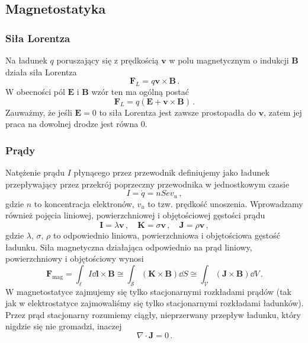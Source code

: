 \documentclass[../main.tex]{subfiles}
\begin{document}
\subsection{Magnetostatyka}
\subsubsection{Siła Lorentza}
Na ładunek \(q\) poruszający się z prędkością \(\mathbf{v}\) w polu magnetycznym o indukcji \(\mathbf{B}\) działa siła Lorentza
\begin{equation*}
    \mathbf{F}_L=q\mathbf{v}\times\mathbf{B}\,.
\end{equation*}
W obecności pól \(\mathbf{E}\) i \(\mathbf{B}\) wzór ten ma ogólną postać
\begin{equation*}
    \mathbf{F}_L=q(\mathbf{E}+\mathbf{v}\times\mathbf{B})\,.
\end{equation*}
Zauważmy, że jeśli \(\mathbf{E}=0\) to siła Lorentza jest zawsze prostopadła do \(\mathbf{v}\), zatem jej praca na dowolnej drodze jest równa 0.
\subsubsection{Prądy}
Natężenie prądu \(I\) płynącego przez przewodnik definiujemy jako ładunek przepływający przez przekrój poprzeczny przewodnika w jednostkowym czasie
\begin{equation*}
    I=\dot q=nSev_u\,,
\end{equation*}
gdzie \(n\) to koncentracja elektronów, \(v_u\) to tzw. prędkość unoszenia. Wprowadzamy również pojęcia liniowej, powierzchniowej i objętościowej gęstości prądu
\begin{equation*}
    \mathbf{I}=\lambda\mathbf{v}\,,\quad\mathbf{K}=\sigma\mathbf{v}\,,\quad\mathbf{J}=\rho\mathbf{v}\,,
\end{equation*}
gdzie \(\lambda\), \(\sigma\), \(\rho\) to odpowiednio liniowa, powierzchniowa i objętościowa gęstość ładunku. Siła magnetyczna działająca odpowiednio na prąd liniowy, powierzchniowy i objętościowy wynosi
\begin{equation*}
    \mathbf{F}_\text{mag}=\int_\ell I\dd{\mathbf{l}}\times\mathbf{B}\cong\int_\mathcal{S}(\mathbf{K}\times\mathbf{B})\dd{S}\cong\int_\mathcal{V}(\mathbf{J}\times\mathbf{B})\dd{V}\,.
\end{equation*}
W magnetostatyce zajmujemy się tylko stacjonarnymi rozkładami prądów (tak jak w elektrostatyce zajmowaliśmy się tylko stacjonarnymi rozkładami ładunków). Przez prąd stacjonarny rozumiemy ciągły, nieprzerwany przepływ ładunku, który nigdzie się nie gromadzi, inaczej
\begin{equation*}
    \nabla\cdot\mathbf{J}=0\,.
\end{equation*}
\end{document}
